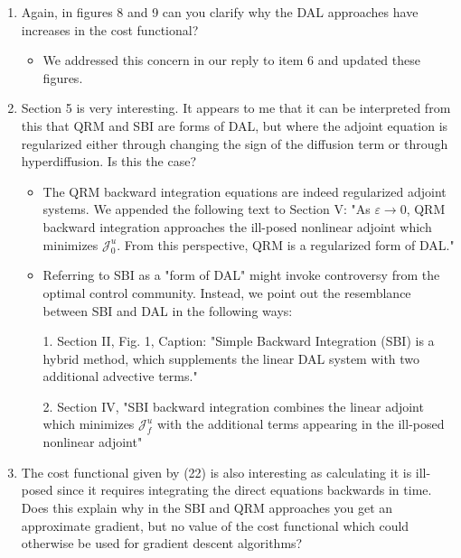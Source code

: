 \documentclass[%
 letter,
 amsmath,amssymb,
]{revtex4-2}
\begin{document}
\begin{enumerate}
\begin{itemize}
\end{itemize}\color{black}\item Again, in figures 8 and 9 can you clarify why the DAL approaches  have increases in the cost functional?  \\
\color{blue}\begin{itemize}
  
\item We addressed this concern in our reply to item 6 and updated these figures.

\end{itemize}\color{black}\item Section 5 is very interesting. It appears to me that it can be  interpreted from this that QRM and SBI are forms of DAL, but where the  adjoint equation is regularized either through changing the sign of  the diffusion term or through hyperdiffusion. Is this the case?  \\
\color{blue}\begin{itemize}

\item The QRM backward integration equations are indeed regularized adjoint systems. We appended the following text to Section V: "As $\varepsilon\to 0$, QRM backward integration approaches the ill-posed nonlinear adjoint which minimizes $\mathcal{J}^u_0$. From this perspective, QRM is a regularized form of DAL."
\item Referring to SBI as a "form of DAL" might invoke controversy from the optimal control community. Instead, we point out the resemblance between SBI and DAL in the following ways:

	1. Section II, Fig. 1, Caption: "Simple Backward Integration (SBI) is a hybrid method, which supplements the linear DAL system with two additional advective terms."

	2. Section IV, "SBI backward integration combines the linear adjoint which minimizes $\mathcal{J}^u_f$ with the additional terms appearing in the ill-posed nonlinear adjoint"

\end{itemize}\color{black}\item The cost functional given by (22) is also interesting as  calculating it is ill-posed since it requires integrating the direct  equations backwards in time. Does this explain why in the SBI and QRM  approaches you get an approximate gradient, but no value of the cost  functional which could otherwise be used for gradient descent  algorithms?  \\
\color{blue}\begin{itemize}


\end{itemize}
\end{enumerate}
\end{document}
